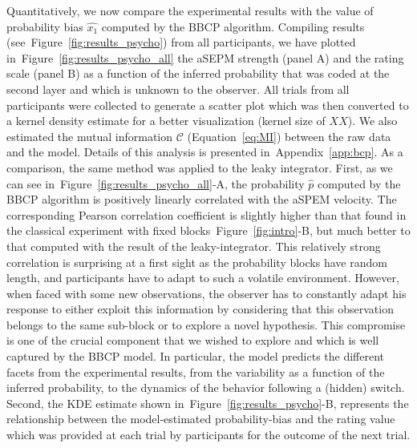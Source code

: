 \documentclass[12pt,english]{article}%
\newcommand{\Cc}{\mathcal{C}}
\newcommand{\seeFig}[1]{Figure~\ref{fig:#1}}
\newcommand{\seeEq}[1]{Equation~\ref{eq:#1}}
\newcommand{\seeApp}[1]{Appendix~\ref{app:#1}}
\begin{document}
Quantitatively, we now compare the experimental results
with the value of probability bias $\hat{x_1}$
computed by the BBCP algorithm.
Compiling results (see~\seeFig{results_psycho}) from all participants,
we have plotted in~\seeFig{results_psycho_all}
the aSEPM strength (panel A) and the rating scale (panel B) as a function of the inferred probability
that was coded at the second layer and which is unknown to the observer.
All trials from all participants were collected to generate a scatter plot 
which was then  converted to a kernel density estimate 
for a better visualization (kernel size of $XX$).
We also estimated the mutual information $\Cc$ (\seeEq{MI})
between the raw data and the model.
Details of this analysis is presented in~\seeApp{bcp}.
As a comparison, the same method was applied to the leaky integrator.
First, as we can see in~\seeFig{results_psycho_all}-A,
the probability $\hat{p}$ computed by the BBCP algorithm
is positively linearly correlated with the aSPEM velocity.
The corresponding Pearson correlation coefficient
is slightly higher than that found in
the classical experiment with fixed blocks~\seeFig{intro}-B,
but much better to that computed with the result of the leaky-integrator.
This relatively strong correlation is surprising at a first sight 
as the probability blocks have random length,
and participants have to adapt to such a volatile environment.
However, when faced with some new observations,
the observer has to constantly adapt his response
to either exploit this information by considering that
this observation belongs to the same sub-block or to explore
a novel hypothesis.
This compromise is one of the crucial component that we wished to explore
and which is well captured by the BBCP model.
In particular, the model predicts the different facets
from the experimental results,
from the variability as a function of the inferred probability,
to the dynamics of the behavior following a (hidden) switch.
Second, the KDE estimate shown in~\seeFig{results_psycho}-B,
represents the relationship between
the model-estimated probability-bias
and the rating value which was provided at each trial
by participants for the outcome of the next trial.
\end{document}
